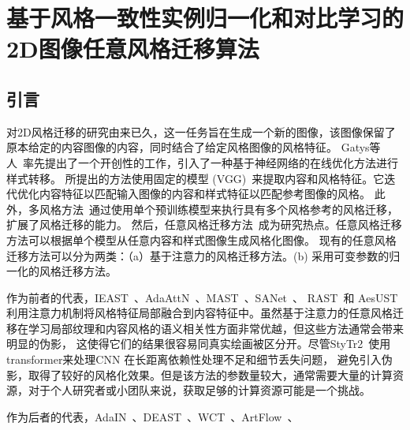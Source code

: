 




\chapter{基于风格一致性实例归一化和对比学习的2D图像任意风格迁移算法}

\section{引言}
对2D风格迁移的研究由来已久，这一任务旨在生成一个新的图像，该图像保留了原本给定的内容图像的内容，同时结合了给定风格图像的风格特征。
Gatys等人~\cite{gatys2016image}率先提出了一个开创性的工作，引入了一种基于神经网络的在线优化方法进行样式转移。
所提出的方法使用固定的模型 (VGG)~\cite{simonyan2014very}来提取内容和风格特征。它迭代优化内容特征以匹配输入图像的内容和样式特征以匹配参考图像的风格。
此外，多风格方法~\cite{dumoulin2016learned}通过使用单个预训练模型来执行具有多个风格参考的风格迁移，扩展了风格迁移的能力。
然后，任意风格迁移方法~\cite{huang2017arbitrary}成为研究热点。任意风格迁移方法可以根据单个模型从任意内容和样式图像生成风格化图像。
现有的任意风格迁移方法可以分为两类：（a）基于注意力的风格迁移方法。(b) 采用可变参数的归一化的风格迁移方法。
\par 作为前者的代表，IEAST~\cite{chen2021artistic}、AdaAttN~\cite{liu2021adaattn}、MAST~\cite{deng2020arbitrary}、SANet~\cite{park2019arbitrary}、
RAST~\cite{ma2023rast}和 AesUST~\cite{wang2022aesust}
利用注意力机制将风格特征局部融合到内容特征中。虽然基于注意力的任意风格迁移在学习局部纹理和内容风格的语义相关性方面非常优越，但这些方法通常会带来明显的伪影，
这使得它们的结果很容易同真实绘画被区分开。尽管StyTr2~\cite{deng2022stytr2}使用transformer来处理CNN 在长距离依赖性处理不足和细节丢失问题，
避免引入伪影，取得了较好的风格化效果。但是该方法的参数量较大，通常需要大量的计算资源，对于个人研究者或小团队来说，获取足够的计算资源可能是一个挑战。
\par 作为后者的代表，AdaIN~\cite{huang2017arbitrary}、DEAST~\cite{zhang2022domain}、WCT~\cite{li2017universal}、ArtFlow~\cite{an2021artflow}、

